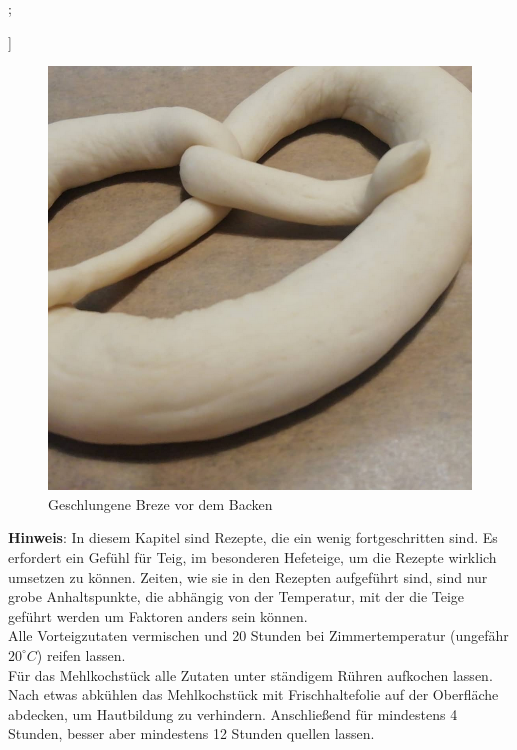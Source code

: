 \begin{tcolorbox}
{{\begin{flushright}
            \end{flushright}
        };}]
    \begin{figure}[H]
        \begin{center}
            \includegraphics[width=0.75\linewidth]{img/breze}
            \caption{Geschlungene Breze vor dem Backen}
        \end{center}
    \end{figure}
    \textbf{Hinweis}: In diesem Kapitel sind Rezepte, die ein wenig fortgeschritten sind.
    Es erfordert ein Gefühl für Teig, im besonderen Hefeteige, um die Rezepte wirklich umsetzen zu können.
    Zeiten, wie sie in den Rezepten aufgeführt sind, sind nur grobe Anhaltspunkte, die abhängig von der Temperatur, mit der die Teige geführt werden um Faktoren anders sein können.\\

    Alle Vorteigzutaten vermischen und 20 Stunden bei Zimmertemperatur (ungefähr $20^\circ C$) reifen lassen.\\

    Für das Mehlkochstück alle Zutaten unter ständigem Rühren aufkochen lassen.
    Nach etwas abkühlen das Mehlkochstück mit Frischhaltefolie auf der Oberfläche abdecken, um Hautbildung zu verhindern.
    Anschließend für mindestens 4 Stunden, besser aber mindestens 12 Stunden quellen lassen.\\


\end{tcolorbox}
